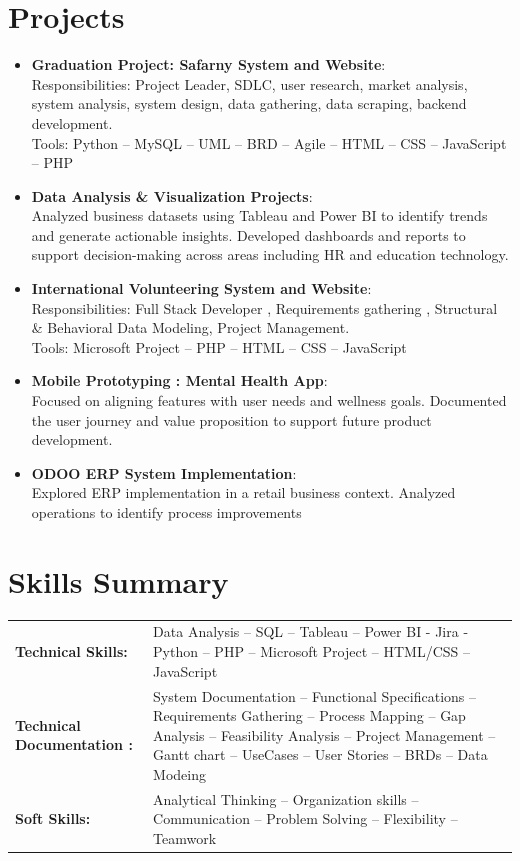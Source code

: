 \documentclass[a4paper,10pt]{article}
\newcommand{\resumeItem}[2]{%
  \item\small{\textbf{#1}: #2\vspace{-2pt}}}
\newcommand{\resumeSubItem}[2]{\resumeItem{#1}{#2}\vspace{-4pt}}
\newcommand{\resumeSubHeadingListStart}{\begin{itemize}[leftmargin=*,itemsep=6pt,topsep=0pt]}
\newcommand{\resumeSubHeadingListEnd}{\end{itemize}}
\begin{document}
\section{Projects}
  \resumeSubHeadingListStart
    \resumeSubItem{Graduation Project: Safarny System and Website}
      {\\Responsibilities: Project Leader, SDLC, user research, market analysis, system analysis, system design, data gathering, data scraping, backend development.\\[3pt]
      Tools: Python -- MySQL -- UML -- BRD -- Agile -- HTML -- CSS -- JavaScript -- PHP}
    \resumeSubItem{Data Analysis \& Visualization Projects}
      {\\Analyzed business datasets using Tableau and Power BI to identify trends and generate actionable insights. Developed dashboards and reports to support decision-making across areas including HR and education technology.}
    \resumeSubItem{International Volunteering System and Website}
      {\\Responsibilities: Full Stack Developer , Requirements gathering , Structural \& Behavioral Data Modeling, Project Management.\\[3pt]
      Tools: Microsoft Project -- PHP -- HTML -- CSS -- JavaScript}
    \resumeSubItem{Mobile Prototyping : Mental Health App}
      {\\Focused on aligning features with user needs and wellness goals. Documented the user journey and value proposition to support future product development.}
    \resumeSubItem{ODOO ERP System Implementation}
      {\\Explored ERP implementation in a retail business context. Analyzed operations to identify process improvements}
  \resumeSubHeadingListEnd
  \vspace{4pt}

\section{Skills Summary}
  \begin{tabularx}{\textwidth}{@{}p{134.5pt}X@{}}
    \textbf{Technical Skills:} & Data Analysis -- SQL -- Tableau -- Power BI - Jira - Python -- PHP -- Microsoft Project -- HTML/CSS -- JavaScript \\ \noalign{\vspace{5pt}}
    \textbf{Technical Documentation :} & System Documentation -- Functional Specifications -- Requirements Gathering -- Process Mapping -- Gap Analysis -- Feasibility Analysis -- Project Management -- Gantt chart -- UseCases -- User Stories -- BRDs -- Data Modeing \\ \noalign{\vspace{5pt}}
    \textbf{Soft Skills:} & Analytical Thinking -- Organization skills -- Communication -- Problem Solving -- Flexibility -- Teamwork \\
  \end{tabularx}
\end{document}
